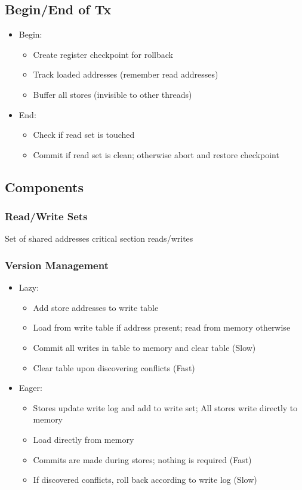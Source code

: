 \documentclass{article}
\begin{document}
\begin{multicols*}{2}
\subsection{Begin/End of Tx}
\begin{itemize}
    \item Begin:
    \begin{itemize}
        \item Create register checkpoint for rollback
        \item Track loaded addresses (remember read addresses)
        \item Buffer all stores (invisible to other threads)
    \end{itemize}
    \item End:
    \begin{itemize}
        \item Check if read set is touched
        \item Commit if read set is clean; otherwise abort and restore checkpoint
    \end{itemize}
\end{itemize}


\subsection{Components}
\subsubsection{Read/Write Sets}
Set of shared addresses critical section reads/writes

\subsubsection{Version Management}
\begin{itemize}
    \item Lazy:
    \begin{itemize}
        \item Add store addresses to write table
        \item Load from write table if address present; read from memory otherwise
        \item Commit all writes in table to memory and clear table (Slow)
        \item Clear table upon discovering conflicts (Fast)
    \end{itemize}
    \item Eager:
    \begin{itemize}
        \item Stores update write log and add to write set; All stores write directly to memory
        \item Load directly from memory
        \item Commits are made during stores; nothing is required (Fast)
        \item If discovered conflicts, roll back according to write log (Slow)
    \end{itemize}
\end{itemize}


\end{multicols*}
\end{document}
